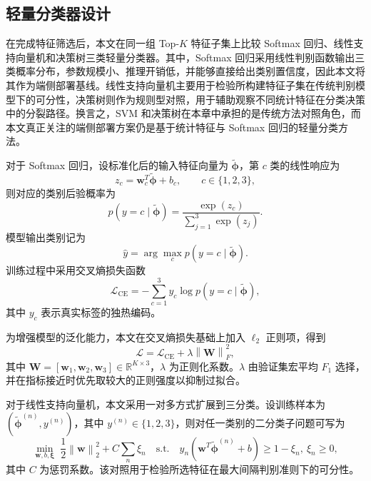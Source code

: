 \documentclass{xdupgthesis}
\begin{document}
\subsection{轻量分类器设计}
\label{subsec:ch3_edge_cls}

在完成特征筛选后，本文在同一组 Top-$K$ 特征子集上比较 Softmax 回归、线性支持向量机和决策树三类轻量分类器。其中，Softmax 回归采用线性判别函数输出三类概率分布，参数规模小、推理开销低，并能够直接给出类别置信度，因此本文将其作为端侧部署基线。线性支持向量机主要用于检验所构建特征子集在传统判别模型下的可分性，决策树则作为规则型对照，用于辅助观察不同统计特征在分类决策中的分裂路径。换言之，SVM 和决策树在本章中承担的是传统方法对照角色，而本文真正关注的端侧部署方案仍是基于统计特征与 Softmax 回归的轻量分类方法。

对于 Softmax 回归，设标准化后的输入特征向量为 $\tilde{\boldsymbol{\phi}}$，第 $c$ 类的线性响应为
\begin{equation}
    z_c=\mathbf{w}_c^T\tilde{\boldsymbol{\phi}}+b_c,\qquad c\in\{1,2,3\},
\end{equation}
则对应的类别后验概率为
\begin{equation}
    p(y=c\mid \tilde{\boldsymbol{\phi}})=\frac{\exp(z_c)}{\sum_{j=1}^{3}\exp(z_j)}.
\end{equation}
模型输出类别记为
\begin{equation}
    \hat{y}=\arg\max_{c} p(y=c\mid \tilde{\boldsymbol{\phi}}).
\end{equation}
训练过程中采用交叉熵损失函数
\begin{equation}
    \mathcal{L}_{\mathrm{CE}}=-\sum_{c=1}^{3} y_c\log p(y=c\mid \tilde{\boldsymbol{\phi}}),
\end{equation}
其中 $y_c$ 表示真实标签的独热编码。

为增强模型的泛化能力，本文在交叉熵损失基础上加入 $\ell_2$ 正则项，得到
\begin{equation}
    \mathcal{L}=\mathcal{L}_{\mathrm{CE}}+\lambda\left\|\mathbf{W}\right\|_F^2,
\end{equation}
其中 $\mathbf{W}=[\mathbf{w}_1,\mathbf{w}_2,\mathbf{w}_3]\in\mathbb{R}^{K\times 3}$，$\lambda$ 为正则化系数。$\lambda$ 由验证集宏平均 $F_1$ 选择，并在指标接近时优先取较大的正则强度以抑制过拟合。

对于线性支持向量机，本文采用一对多方式扩展到三分类。设训练样本为 $(\tilde{\boldsymbol{\phi}}^{(n)},y^{(n)})$，其中 $y^{(n)}\in\{1,2,3\}$，则对任一类别的二分类子问题可写为
\begin{equation}
\min_{\mathbf{w},b,\boldsymbol{\xi}}\;\frac{1}{2}\left\|\mathbf{w}\right\|_2^2+C\sum_{n}\xi_n
\quad
\text{s.t.}\quad
y_n(\mathbf{w}^T\tilde{\boldsymbol{\phi}}^{(n)}+b)\ge 1-\xi_n,\ \xi_n\ge 0,
\end{equation}
其中 $C$ 为惩罚系数。该对照用于检验所选特征在最大间隔判别准则下的可分性。
\end{document}

